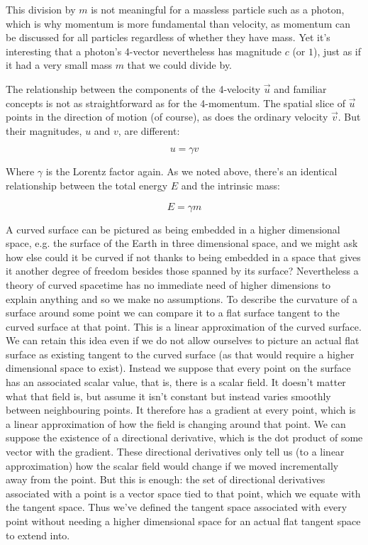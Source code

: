 This division by $m$ is not meaningful for a massless particle such as a photon, which is why momentum is more fundamental than velocity, as momentum can be discussed for all particles regardless of whether they have mass. Yet it's interesting that a photon's 4-vector nevertheless has magnitude $c$ (or $1$), just as if it had a very small mass $m$ that we could divide by.

The relationship between the components of the 4-velocity $\vec{u}$ and familiar concepts is not as straightforward as for the 4-momentum. The spatial slice of $\vec{u}$ points in the direction of motion (of course), as does the ordinary velocity $\vec{v}$. But their magnitudes, $u$ and $v$, are different:

$$u = \gamma v$$

Where $\gamma$ is the Lorentz factor again. As we noted above, there's an identical relationship between the total energy $E$ and the intrinsic mass:

$$E = \gamma m$$



A curved surface can be pictured as being embedded in a higher dimensional space, e.g. the surface of the Earth in three dimensional space, and we might ask how else could it be curved if not thanks to being embedded in a space that gives it another degree of freedom besides those spanned by its surface? Nevertheless a theory of curved spacetime has no immediate need of higher dimensions to explain anything and so we make no assumptions. To describe the curvature of a surface around some point we can compare it to a flat surface tangent to the curved surface at that point. This is a linear approximation of the curved surface. We can retain this idea even if we do not allow ourselves to picture an actual flat surface as existing tangent to the curved surface (as that would require a higher dimensional space to exist). Instead we suppose that every point on the surface has an associated scalar value, that is, there is a scalar field. It doesn't matter what that field is, but assume it isn't constant but instead varies smoothly between neighbouring points. It therefore has a gradient at every point, which is a linear approximation of how the field is changing around that point. We can suppose the existence of a directional derivative, which is the dot product of some vector with the gradient. These directional derivatives only tell us (to a linear approximation) how the scalar field would change if we moved incrementally away from the point. But this is enough: the set of directional derivatives associated with a point is a vector space tied to that point, which we equate with the tangent space. Thus we've defined the tangent space associated with every point without needing a higher dimensional space for an actual flat tangent space to extend into.

